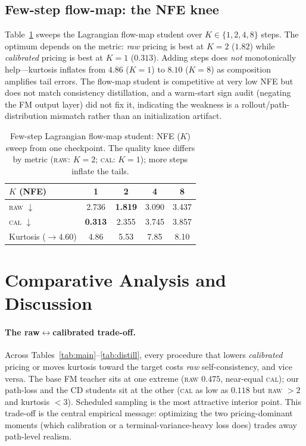 \documentclass[11pt]{article}
\newcommand{\raw}{\textsc{raw}}
\renewcommand{\cal}{\textsc{cal}}
\newcommand{\best}[1]{\textbf{#1}}
\begin{document}
\subsection{Few-step flow-map: the NFE knee}
\label{sec:results-nfe}
Table~\ref{tab:nfe} sweeps the Lagrangian flow-map student over
$K\in\{1,2,4,8\}$ steps. The optimum depends on the metric: \emph{raw} pricing is
best at $K{=}2$ ($1.82$) while \emph{calibrated} pricing is best at $K{=}1$
($0.313$). Adding steps does \emph{not} monotonically help---kurtosis inflates from
$4.86$ ($K{=}1$) to $8.10$ ($K{=}8$) as composition amplifies tail errors. The
flow-map student is competitive at very low NFE but does not match consistency
distillation, and a warm-start sign audit (negating the FM output layer) did not
fix it, indicating the weakness is a rollout/path-distribution mismatch rather
than an initialization artifact.

\begin{table}[t]
\centering
\caption{Few-step Lagrangian flow-map student: NFE ($K$) sweep from one checkpoint.
The quality knee differs by metric (\raw{}: $K{=}2$; \cal{}: $K{=}1$); more steps
inflate the tails.}
\label{tab:nfe}
\small
\begin{tabular}{l c c c c}
\toprule
$K$ (NFE) & 1 & 2 & 4 & 8 \\
\midrule
\raw{} $\downarrow$  & 2.736 & \best{1.819} & 3.090 & 3.437 \\
\cal{} $\downarrow$  & \best{0.313} & 2.355 & 3.745 & 3.857 \\
Kurtosis ($\to 4.60$) & 4.86 & 5.53 & 7.85 & 8.10 \\
\bottomrule
\end{tabular}
\end{table}

\section{Comparative Analysis and Discussion}
\label{sec:discussion}

\paragraph{The raw$\leftrightarrow$calibrated trade-off.}
Across Tables~\ref{tab:main}--\ref{tab:distill}, every procedure that lowers
\emph{calibrated} pricing or moves kurtosis toward the target costs \emph{raw}
self-consistency, and vice versa. The base FM teacher sits at one extreme
(\raw{} $0.475$, near-equal \cal{}); our path-loss and the CD students sit at the
other (\cal{} as low as $0.118$ but \raw{} $>2$ and kurtosis $<3$). Scheduled
sampling is the most attractive interior point. This trade-off is the central
empirical message: optimizing the two pricing-dominant moments (which calibration
or a terminal-variance-heavy loss does) trades away path-level realism.
\end{document}
